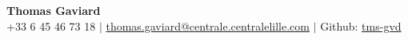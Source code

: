 \begin{center}
    \textbf{\huge Thomas Gaviard} \\ \vspace{3pt}
    \small
    \faMobile \hspace{.5pt} +33 6 45 46 73 18
    $|$
    \faAt \hspace{.5pt} \href{mailto:thomas.gaviard@centrale.centralelille.com}{thomas.gaviard@centrale.centralelille.com}
    $|$
    \faGlobe \hspace{.5pt} Github: \href{https://github.com/tms-gvd}{tms-gvd}
\end{center}